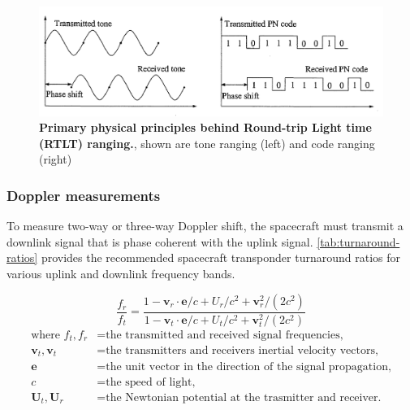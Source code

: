 \begin{figure}
    \centering
    \captionsetup{format=hang} %
    \includegraphics[width=1.0\linewidth]{graphics/ranging-method.PNG}
    \caption{
        \textbf{Primary physical principles behind Round-trip Light time (RTLT)
            ranging.}, shown are tone ranging (left) and code ranging (right)
        \cite[p.~196]{Montenbruck2000}
    }
    \label{fig:ranging-methods}
\end{figure}


\subsubsection{Doppler measurements}

To measure two-way or three-way Doppler shift, the spacecraft must transmit a
downlink signal that is phase coherent with the uplink signal.
\autoref{tab:turnaround-ratios} provides the recommended spacecraft transponder
turnaround ratios for various uplink and downlink frequency bands.





\begin{equation}
    \frac{f_r}{f_t} = \frac{
        1-\mathbf{v}_r\cdot{}\mathbf{e}/c + U_r/c^2 +\mathbf{v}_r^2/(2c^2)
    }{
        1-\mathbf{v}_t\cdot{}\mathbf{e}/c + U_t/c^2 +\mathbf{v}_t^2/(2c^2)
    }
\end{equation}
\begin{equation*}
    \begin{aligned}
        \textrm{where  }
        f_t, f_r & = \textrm{the transmitted and received signal frequencies,}            \\
        \mathbf{v}_t, \mathbf{v}_t & = \textrm{the transmitters and receivers inertial velocity vectors,}   \\
        \mathbf{e}                 & = \textrm{the unit vector in the direction of the signal propagation,} \\
        c                          & = \textrm{the speed of light,}                                         \\
        \mathbf{U}_t, \mathbf{U}_r & = \textrm{the Newtonian potential at the trasmitter and receiver.}     \\
    \end{aligned}
\end{equation*}

